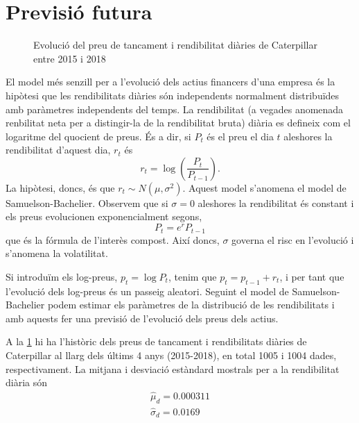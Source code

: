 \documentclass{article}
\numberwithin{table}{section}
\numberwithin{figure}{section}
\numberwithin{equation}{section}
\begin{document}
\section{Previsió futura}
\begin{figure}[htb]
	\centering \sffamily \small
	
	\caption{Evolució del preu de tancament i rendibilitat diàries de Caterpillar entre 2015 i 2018}
	\label{fig:serie preus}
\end{figure}
El model més senzill per a l'evolució dels actius financers d'una empresa és la hipòtesi que les rendibilitats diàries són independents normalment distribuïdes amb paràmetres independents del temps. La rendibilitat (a vegades anomenada renbilitat neta per a distingir-la de la rendibilitat bruta) diària es defineix com el logaritme del quocient de preus. És a dir, si \( P_t \) és el preu el dia \( t \) aleshores la rendibilitat d'aquest dia, \( r_t \) és
\begin{equation*}
	r_t = \log{\left(\frac{P_t}{P_{t-1}}\right)}.
\end{equation*}
La hipòtesi, doncs, és que \( r_t \sim N(\mu, \sigma^2) \). Aquest model s'anomena el model de Samuelson-Bachelier. Observem que si \( \sigma = 0 \) aleshores la rendibilitat és constant i els preus evolucionen exponencialment segons,
\begin{equation*}
	P_t = e^{r}P_{t-1}
\end{equation*}
que és la fórmula de l'interès compost. Així doncs, \( \sigma \) governa el risc en l'evolució i s'anomena la volatilitat. 

Si introduïm els log-preus, \( p_t = \log{P_t} \), tenim que \( p_t = p_{t-1} + r_t \), i per tant que l'evolució dels log-preus és un passeig aleatori. Seguint el model de Samuelson-Bachelier podem estimar els paràmetres de la distribució de les rendibilitats i amb aquests fer una previsió de l'evolució dels preus dels actius.  

A la \cref{fig:serie preus} hi ha l'històric dels preus de tancament i rendibilitats diàries de Caterpillar al llarg dels últims 4 anys (2015-2018), en total 1005 i 1004 dades, respectivament. La mitjana i desviació estàndard mostrals per a la rendibilitat diària són
\begin{equation} \label{eq:parametres}
	\begin{gathered}
		\hat{\mu}_d = 0.000311 \\
		\hat{\sigma}_d	= 0.0169 \\
	\end{gathered}
\end{equation}
\end{document}

